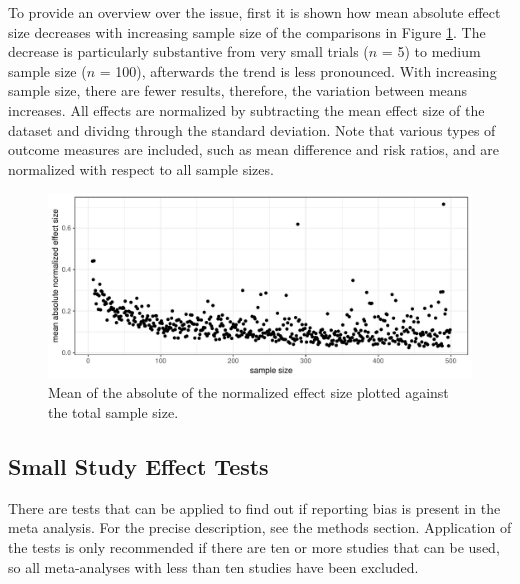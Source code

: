 \documentclass[11pt,a4paper,twoside]{book}\usepackage[]{graphicx}\usepackage[]{color}
\newenvironment{knitrout}{}{} %
\begin{document}
\vspace{0mm}
To provide an overview over the issue, first it is shown how mean absolute effect size decreases with increasing sample size of the comparisons in Figure \ref{effect.samplesize}. The decrease is particularly substantive from very small trials ($n$ = 5) to medium sample size ($n$ = 100), afterwards the trend is less pronounced. With increasing sample size, there are fewer results, therefore, the variation between means increases. All effects are normalized by subtracting the mean effect size of the dataset and dividng through the standard deviation. Note that various types of outcome measures are included, such as mean difference and risk ratios, and are normalized with respect to all sample sizes.

\begin{figure}
\begin{knitrout}
\color{fgcolor}

{\centering \includegraphics[width=\textwidth-3cm]{figure/ch02_figunnamed-chunk-17-1} 

}



\end{knitrout}
\caption{Mean of the absolute of the normalized effect size plotted against the total sample size.}
\label{effect.samplesize}
\end{figure}

\subsection{Small Study Effect Tests}





There are tests that can be applied to find out if reporting bias is present in the meta analysis. For the precise description, see the methods section. Application of the tests is only recommended if there are ten or more studies \citep{cochrane.handbook} that can be used, so all meta-analyses with less than ten studies have been excluded.
\end{document}
